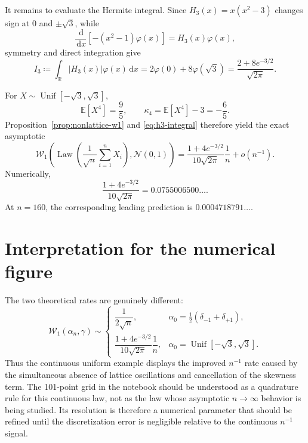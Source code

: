 \documentclass[11pt]{article}
\theoremstyle{remark}
\newcommand{\R}{\mathbb{R}}
\newcommand{\E}{\mathbb{E}}
\newcommand{\Wass}{\mathcal{W}}
\newcommand{\dd}{\,\mathrm{d}}
\newcommand{\abs}[1]{\left\lvert #1\right\rvert}
\newcommand{\Law}{\operatorname{Law}}
\newcommand{\Unif}{\operatorname{Unif}}
\begin{document}
It remains to evaluate the Hermite integral. Since
$H_3(x)=x(x^2-3)$ changes sign at $0$ and $\pm\sqrt3$, while
\begin{equation}\label{eq:hermite-antiderivative}
  \frac{\dd}{\dd x}\left[-(x^2-1)\varphi(x)\right]
  =H_3(x)\varphi(x),
\end{equation}
symmetry and direct integration give
\begin{equation}\label{eq:h3-integral}
  I_3\coloneqq\int_{\R}\abs{H_3(x)}\varphi(x)\dd x
  =2\varphi(0)+8\varphi(\sqrt3)
  =\frac{2+8e^{-3/2}}{\sqrt{2\pi}}.
\end{equation}

For $X\sim\Unif[-\sqrt3,\sqrt3]$,
\begin{equation}\label{eq:uniform-cumulant}
  \E[X^4]=\frac95,
  \qquad
  \kappa_4=\E[X^4]-3=-\frac65.
\end{equation}
Proposition~\ref{prop:nonlattice-w1} and \eqref{eq:h3-integral} therefore
yield the exact asymptotic
\begin{equation}\label{eq:uniform-final}
  \boxed{
  \Wass_1\!\left(
    \Law\!\left(\frac1{\sqrt n}\sum_{i=1}^nX_i\right),
    \mathcal N(0,1)
  \right)
  =\frac{1+4e^{-3/2}}{10\sqrt{2\pi}}\frac1n+o(n^{-1}).}
\end{equation}
Numerically,
\begin{equation}\label{eq:uniform-numerical-constant}
  \frac{1+4e^{-3/2}}{10\sqrt{2\pi}}
  =0.0755006500\ldots.
\end{equation}
At $n=160$, the corresponding leading prediction is
$0.0004718791\ldots$.

\section{Interpretation for the numerical figure}

The two theoretical rates are genuinely different:
\begin{equation}\label{eq:comparison-final}
  \Wass_1(\alpha_n,\gamma)
  \sim
  \begin{cases}
    \dfrac{1}{2\sqrt n},
      & \alpha_0=\frac12(\delta_{-1}+\delta_{+1}),\\[2mm]
    \dfrac{1+4e^{-3/2}}{10\sqrt{2\pi}}\dfrac1n,
      & \alpha_0=\Unif[-\sqrt3,\sqrt3].
  \end{cases}
\end{equation}
Thus the continuous uniform example displays the improved $n^{-1}$ rate
caused by the simultaneous absence of lattice oscillations and cancellation
of the skewness term. The 101-point grid in the notebook should be understood
as a quadrature rule for this continuous law, not as the law whose asymptotic
$n\to\infty$ behavior is being studied. Its resolution is therefore a
numerical parameter that should be refined until the discretization error is
negligible relative to the continuous $n^{-1}$ signal.
\end{document}
